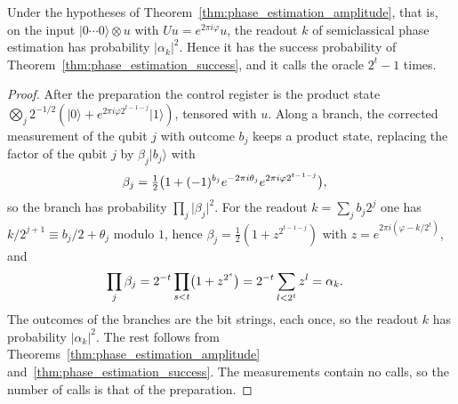 \begin{theorem}
    \label{thm:phase_estimation_semiclassical}
    \leanok
    Under the hypotheses of Theorem~\ref{thm:phase_estimation_amplitude}, that is, on the
    input $\lvert0\cdots0\rangle\otimes u$ with $Uu=e^{2\pi i\varphi}u$, the readout $k$
    of semiclassical phase estimation has probability $\lvert\alpha_k\rvert^2$. Hence it
    has the success probability of Theorem~\ref{thm:phase_estimation_success}, and it
    calls the oracle $2^t-1$ times.
\end{theorem}
\begin{proof}\leanok
    After the preparation the control register is the product state
    $\bigotimes_j2^{-1/2}(\lvert0\rangle+e^{2\pi i\varphi2^{t-1-j}}\lvert1\rangle)$, tensored
    with $u$. Along a branch, the corrected measurement of the qubit $j$ with outcome $b_j$
    keeps a product state, replacing the factor of the qubit $j$ by
    $\beta_j\lvert b_j\rangle$ with
    \begin{align}
        \beta_j&=\tfrac12\bigl(1+(-1)^{b_j}e^{-2\pi i\theta_j}e^{2\pi i\varphi2^{t-1-j}}\bigr),
        \notag
    \end{align}
    so the branch has probability $\prod_j\lvert\beta_j\rvert^2$. For the readout
    $k=\sum_jb_j2^j$ one has $k/2^{j+1}\equiv b_j/2+\theta_j$ modulo $1$, hence
    $\beta_j=\tfrac12(1+z^{2^{t-1-j}})$ with $z=e^{2\pi i(\varphi-k/2^t)}$, and
    \begin{align}
        \prod_j\beta_j&=2^{-t}\prod_{s<t}\bigl(1+z^{2^s}\bigr)=2^{-t}\sum_{l<2^t}z^l=\alpha_k.
        \notag
    \end{align}
    The outcomes of the branches are the bit strings, each once, so the readout $k$ has
    probability $\lvert\alpha_k\rvert^2$. The rest follows from
    Theorems~\ref{thm:phase_estimation_amplitude} and~\ref{thm:phase_estimation_success}.
    The measurements contain no calls, so the number of calls is that of the
    preparation.
\end{proof}
